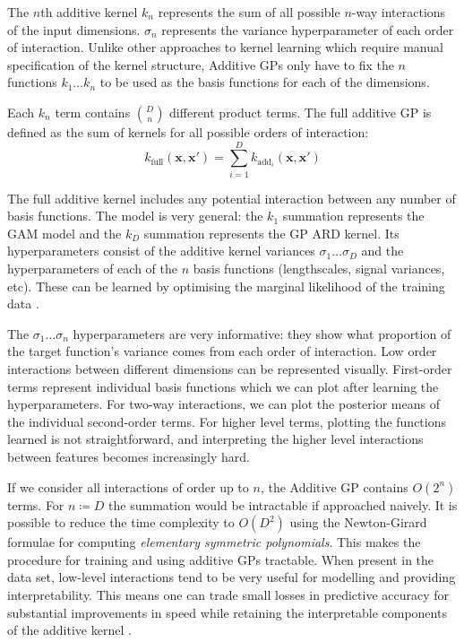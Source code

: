 \documentclass[a4paper,12pt ]{report}
\renewcommand{\GP}{{GP}}
\begin{document}
The $n$th additive kernel $k_{n}$ represents the sum of all possible $n$-way interactions of the input dimensions. $\sigma_n$ represents the variance hyperparameter of each order of interaction. Unlike other approaches to kernel learning which require manual specification of the kernel structure, Additive {\GP}s only have to fix the $n$ functions $k_{1} \ldots k_{n}$ to be used as the basis functions for each of the dimensions.

Each $k_n$ term contains $ {D \choose n} $ different product terms. The full additive {\GP} is defined as the sum of kernels for all possible orders of interaction:
\begin{equation*} k_{\mathrm{full}}(\mathbf{x, x'}) = \sum_{i = 1}^{D}{ k_{\mathrm{{add}}_{i}}(\mathbf{x, x'}) }  \end{equation*}

The full additive kernel includes any potential interaction between any number of basis functions. The model is very general: the $k_1$ summation represents the GAM model and the $k_{D}$ summation represents the {\GP} {\SE} ARD kernel. Its hyperparameters consist of the additive kernel variances $\sigma_1 \ldots \sigma_{D}$ and the hyperparameters of each of the $n$ basis functions (lengthscales, signal variances, etc). These can be learned by optimising the marginal likelihood of the training data \cite{duvenaud2011additive11}.

The $\sigma_1 \ldots \sigma_n$ hyperparameters are very informative: they show what proportion of the target function's variance comes from each order of interaction. Low order interactions between different dimensions can be represented visually. First-order terms represent individual basis functions which we can plot after learning the hyperparameters. For two-way interactions, we can plot the posterior means of the individual second-order terms. For higher level terms, plotting the functions learned is not straightforward, and interpreting the higher level interactions between features becomes increasingly hard.


If we consider all interactions of order up to $n$, the Additive {\GP} contains $O(2^n)$ terms. For $n \coloneqq D$ the summation would be intractable if approached naively. It is possible to reduce the time complexity to $O(D^2)$ using the Newton-Girard formulae for computing \emph{elementary symmetric polynomials}. This makes the procedure for training and using additive {\GP}s tractable. When present in the data set, low-level interactions tend to be very useful for modelling and providing interpretability. This means one can trade small losses in predictive accuracy for substantial improvements in speed while retaining the interpretable components of the additive kernel \cite{duvenaud2011additive11}.
\end{document}
